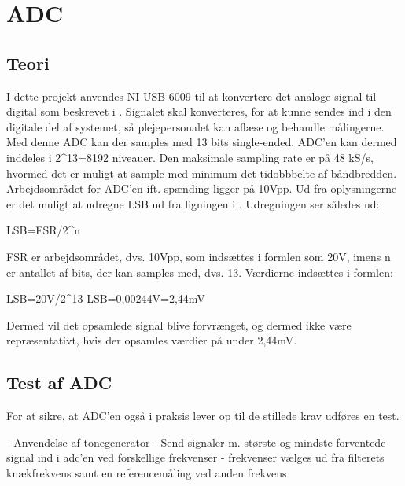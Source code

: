 \section{ADC}

\subsection{Teori}
I dette projekt anvendes NI USB-6009 til at konvertere det analoge signal til digital som beskrevet i . Signalet skal konverteres, for at kunne sendes ind i den digitale del af systemet, så plejepersonalet kan aflæse og behandle målingerne. Med denne ADC kan der samples med 13 bits single-ended. ADC'en kan dermed inddeles i 2^13=8192 niveauer. Den maksimale sampling rate er på 48 kS/s, hvormed det er muligt at sample med minimum det tidobbbelte af båndbredden. Arbejdsområdet for ADC'en ift. spænding ligger på 10Vpp. \cite{Instruments2014} Ud fra oplysningerne er det muligt at udregne LSB ud fra ligningen i . Udregningen ser således ud: \\
\begin{center}
	LSB=FSR/2^n 
\end{center}  
FSR er arbejdsområdet, dvs. 10Vpp, som indsættes i formlen som 20V, imens n er antallet af bits, der kan samples med, dvs. 13.
Værdierne indsættes i formlen: \\
\begin{center}
	LSB=20V/2^13
	LSB=0,00244V=2,44mV
\end{center}
Dermed vil det opsamlede signal blive forvrænget, og dermed ikke være repræsentativt, hvis der opsamles værdier på under 2,44mV. 

\subsection{Test af ADC}
For at sikre, at ADC'en også i praksis lever op til de stillede krav udføres en test.

- Anvendelse af tonegenerator
- Send signaler m. største og mindste forventede signal ind i adc'en ved forskellige frekvenser - frekvenser vælges ud fra filterets knækfrekvens samt en referencemåling ved anden frekvens